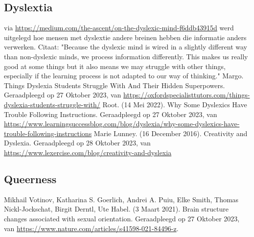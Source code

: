 \begin{thebibliography}{9}
        \item[\bigskip\subsection*{Dyslextia}]
                via \url{https://medium.com/the-ascent/on-the-dyslexic-mind-f6ddb43915d} werd uitgelegd hoe mensen met dyslextie andere breinen hebben die informatie anders verwerken. Citaat: "Because the dyslexic mind is wired in a slightly different way than non-dyslexic minds, we process information differently. This makes us really good at some things but it also means we may struggle with other things, especially if the learning process is not adapted to our way of thinking."    
                Margo. Things Dyslexia Students Struggle With And Their Hidden Superpowers.  Geraadpleegd op 27 Oktober 2023, van \url{https://oxfordspecialisttutors.com/things-dyslexia-students-struggle-with/}
                Root. (14 Mei 2022). Why Some Dyslexics Have Trouble Following Instructions. Geraadpleegd op 27 Oktober 2023, van \url{https://www.learningsuccessblog.com/blog/dyslexia/why-some-dyslexics-have-trouble-following-instructions}
                Marie Lunney. (16 December 2016). Creativity and Dyslexia. Geraadpleegd op 28 Oktober 2023, van \url{https://www.lexercise.com/blog/creativity-and-dyslexia}
        
        \item[\bigskip\subsection*{Queerness}]
                Mikhail Votinov, Katharina S. Goerlich, Andrei A. Puiu, Elke Smith, Thomas Nickl-Jockschat, Birgit Derntl, Ute Habel. (3 Maart 2021). Brain structure changes associated with sexual orientation. Geraadpleegd op 27 Oktober 2023, van \url{https://www.nature.com/articles/s41598-021-84496-z}.
                

\end{thebibliography}
